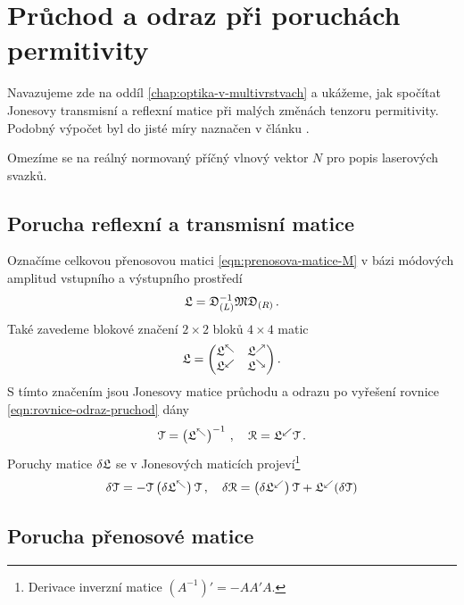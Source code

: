 \section{Průchod a odraz při poruchách permitivity}
\label{app:berreman}

Navazujeme zde na oddíl \ref{chap:optika-v-multivrstvach} a ukážeme, jak spočítat Jonesovy transmisní a reflexní matice při malých změnách tenzoru permitivity.
Podobný výpočet byl do jisté míry naznačen v článku \cite{bertrandGeneralAnalyticalTreatment2001}.

Omezíme se na reálný normovaný příčný vlnový vektor $N$ pro popis laserových svazků.

\subsection*{Porucha reflexní a transmisní matice}

Označíme celkovou přenosovou matici \eqref{eqn:prenosova-matice-M} v bázi módových amplitud vstupního a výstupního prostředí
\begin{equation}
    \mathfrak{L} = \mathfrak{D}_{(L)}^{-1} \mathfrak{M}  \mathfrak{D}_{(R)} \,.
\end{equation}
Také zavedeme blokové značení $2\times2$ bloků $4\times4$ matic
\begin{equation}
    \mathfrak{L} = \begin{pmatrix} \mathfrak{L}^\nwarrow & \mathfrak{L}^\nearrow \\
    \mathfrak{L}^\swarrow & \mathfrak{L}^\searrow \end{pmatrix} .
\end{equation}
S tímto značením jsou Jonesovy matice průchodu a odrazu po vyřešení rovnice \eqref{eqn:rovnice-odraz-pruchod} dány
\begin{equation}
    \mathcal{T} = \left(\mathfrak{L}^\nwarrow\right)^{-1} \,, \quad \mathcal{R}=\mathfrak{L}^\swarrow \mathcal{T} \,.
\end{equation}
Poruchy matice $\delta\mathfrak{L}$ se v Jonesových maticích projeví\footnote{Derivace inverzní matice $(A^{-1})'=-AA'A$.}
\begin{equation}
    \label{eqn:app-derivace-RT}
    \delta\mathcal{T} = -\mathcal{T} \left(\delta\mathfrak{L}^\nwarrow \right) \mathcal{T} \,, \quad \delta\mathcal{R}=\left(\delta\mathfrak{L}^\swarrow\right) \mathcal{T} + \mathfrak{L}^\swarrow (\delta\mathcal{T})
\end{equation}

\subsection*{Porucha přenosové matice}
